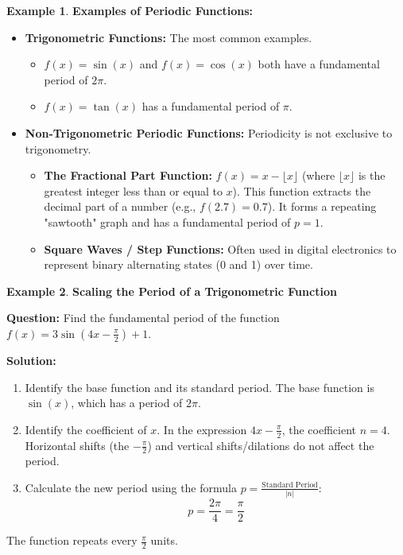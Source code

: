 \documentclass[12pt]{article}
\theoremstyle{definition}
\newtheorem{example}{Example}[section]
\begin{document}
\begin{example}
\textbf{Examples of Periodic Functions:}
\begin{itemize}[leftmargin=*]
  \item \textbf{Trigonometric Functions:} The most common examples.
  \begin{itemize}
    \item $f(x) = \sin(x)$ and $f(x) = \cos(x)$ both have a fundamental period of $2\pi$.
    \item $f(x) = \tan(x)$ has a fundamental period of $\pi$.
  \end{itemize}
  \item \textbf{Non-Trigonometric Periodic Functions:} Periodicity is not exclusive to trigonometry.
  \begin{itemize}
    \item \textbf{The Fractional Part Function:} $f(x) = x - \lfloor x \rfloor$ (where $\lfloor x \rfloor$ is the greatest integer less than or equal to $x$). This function extracts the decimal part of a number (e.g., $f(2.7) = 0.7$). It forms a repeating "sawtooth" graph and has a fundamental period of $p = 1$.
    \item \textbf{Square Waves / Step Functions:} Often used in digital electronics to represent binary alternating states (0 and 1) over time.
  \end{itemize}
\end{itemize}
\end{example}


\begin{example}
\textbf{Scaling the Period of a Trigonometric Function}

\textbf{Question:} Find the fundamental period of the function $f(x) = 3\sin(4x - \frac{\pi}{2}) + 1$.

\textbf{Solution:}
\begin{enumerate}
  \item Identify the base function and its standard period. The base function is $\sin(x)$, which has a period of $2\pi$.
  \item Identify the coefficient of $x$. In the expression $4x - \frac{\pi}{2}$, the coefficient $n = 4$. Horizontal shifts (the $-\frac{\pi}{2}$) and vertical shifts/dilations do not affect the period.
  \item Calculate the new period using the formula $p = \frac{\text{Standard Period}}{|n|}$:
  \[
  p = \frac{2\pi}{4} = \frac{\pi}{2}
  \]
\end{enumerate}
The function repeats every $\frac{\pi}{2}$ units.
\end{example}
\end{document}
